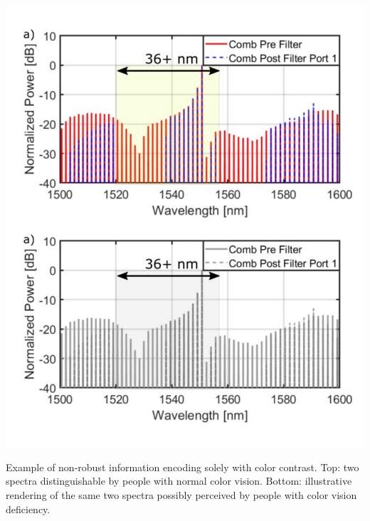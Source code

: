\begin{marginfigure}%
    \includegraphics[width=\linewidth]{../../fig/color.pdf}
    \caption{Example of non-robust information encoding solely with color contrast. Top: two spectra distinguishable by people with normal color vision. Bottom: illustrative rendering of the same two spectra possibly perceived by people with color vision deficiency.}
    \label{fig:color}
\end{marginfigure}

